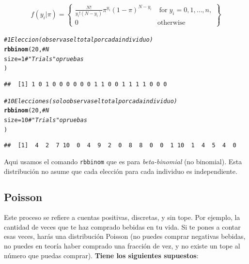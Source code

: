 \documentclass[onesided]{article}\usepackage[]{graphicx}\usepackage[]{color}
\makeatletter
\newcommand{\hlnum}[1]{\textcolor[rgb]{0.686,0.059,0.569}{#1}}%
\newcommand{\hlcom}[1]{\textcolor[rgb]{0.678,0.584,0.686}{\textit{#1}}}%
\newcommand{\hlstd}[1]{\textcolor[rgb]{0.345,0.345,0.345}{#1}}%
\newcommand{\hlkwc}[1]{\textcolor[rgb]{0.333,0.667,0.333}{#1}}%
\newcommand{\hlkwd}[1]{\textcolor[rgb]{0.737,0.353,0.396}{\textbf{#1}}}%
\newenvironment{kframe}{%
 \def\at@end@of@kframe{}%
 \ifinner\ifhmode%
  \def\at@end@of@kframe{\end{minipage}}%
  \begin{minipage}{\columnwidth}%
 \fi\fi%
 \def\FrameCommand##1{\hskip\@totalleftmargin \hskip-\fboxsep
 \colorbox{shadecolor}{##1}\hskip-\fboxsep
     \hskip-\linewidth \hskip-\@totalleftmargin \hskip\columnwidth}%
 \MakeFramed {\advance\hsize-\width
   \@totalleftmargin\z@ \linewidth\hsize
   \@setminipage}}%
 {\par\unskip\endMakeFramed%
 \at@end@of@kframe}
\newenvironment{knitrout}{}{} %
\makeatother
\begin{document}
\begin{equation}\label{Binomial}
\begin{split}
f(y_{i}|\pi) =	\begin{Bmatrix} \frac{N!}{y_{i}!(N-y_{i})} \pi^{y_{i}}(1-\pi)^{N-y_{i}} & \;\text{for}\; y_{i}=0,1,\ldots,n, \\ 
0 & \text{otherwise} \end{Bmatrix}
\end{split}
\end{equation}


\begin{knitrout}
\color{fgcolor}\begin{kframe}
\begin{alltt}
\hlcom{# 1 Eleccion (observas el total por cada individuo)}
\hlkwd{rbbinom}\hlstd{(}\hlnum{20}\hlstd{,} \hlcom{# N}
\hlkwc{size} \hlstd{=} \hlnum{1} \hlcom{# "Trials" o pruebas}
\hlstd{)}
\end{alltt}
\begin{verbatim}
##  [1] 1 0 1 0 0 0 0 0 0 1 1 0 0 1 1 1 1 0 0 0
\end{verbatim}
\begin{alltt}
\hlcom{# 10 Elecciones (solo observas el total por cada individuo)}
\hlkwd{rbbinom}\hlstd{(}\hlnum{20}\hlstd{,}\hlcom{#N}
\hlkwc{size} \hlstd{=} \hlnum{10} \hlcom{# "Trials" o pruebas}
\hlstd{)}
\end{alltt}
\begin{verbatim}
##  [1]  4  2  7 10  0  4  9  2  0  8  8  0  0  1 10  1  4  5  4  0
\end{verbatim}
\end{kframe}
\end{knitrout}

Aqui usamos el comando \texttt{rbbinom} que es para \emph{beta-binomial} (no binomial). Esta distribuci\'on no asume que cada elecci\'on para cada individuo es independiente.

\subsection{Poisson}

Este proceso se refiere a cuentas positivas, discretas, y sin tope. Por ejemplo, la cantidad de veces que te haz comprado bebidas en tu vida. Si te pones a contar esas veces, har\'as una distribuci\'on Poisson (no puedes comprar negativas bebidas, no puedes en teor\'ia haber comprado una fracci\'on de vez, y no existe un tope al n\'umero que puedas comprar). {\bf Tiene los siguientes supuestos}:
\end{document}
